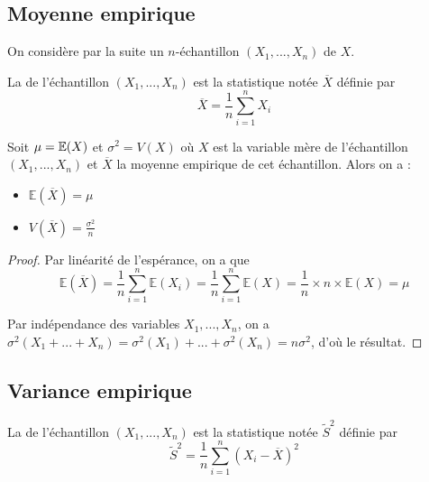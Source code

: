 \subsection{Moyenne empirique}
On considère par la suite un $n$-échantillon $(X_1,...,X_n)$ de $X$.

\begin{definition}{}{}
La  de l'échantillon $(X_1,...,X_n)$ est la statistique notée $\overline{X}$ définie par 
$$\overline{X}=\frac{1}{n}\sum_{i=1}^n X_i$$
\end{definition}

\begin{proposition}{}{}
 Soit $\mu=\mathbb{E}(X)$ et $\sigma^2=V(X)$ où $X$ est la variable mère de l'échantillon $(X_1,...,X_n)$ et $\overline{X}$ la moyenne empirique de cet échantillon. Alors on a :
 \begin{itemize}
  \item $\mathbb{E}(\overline{X})=\mu$
  \item $V(\overline{X}) = \frac{\sigma^2}{n}$
 \end{itemize}
\end{proposition}
\begin{proof}
 Par linéarité de l'espérance, on a que $$\mathbb{E}(\overline{X})=\frac{1}{n}\sum_{i=1}^n \mathbb{E}(X_i)=\frac{1}{n}\sum_{i=1}^n \mathbb{E}(X) = \frac{1}{n} \times n \times \mathbb{E}(X) = \mu$$
 
 Par indépendance des variables $X_1,...,X_n$, on a  $\sigma^2(X_1+...+X_n)=\sigma^2(X_1)+...+\sigma^2(X_n) = n \sigma^2$, d'où le résultat.
\end{proof}

\subsection{Variance empirique}
\begin{definition}{}{}
La  de l'échantillon $(X_1,...,X_n)$ est la statistique notée $\tilde{S}^2$ définie par 
$$\tilde{S}^2=\frac{1}{n}\sum_{i=1}^n (X_i-\overline{X})^2$$
\end{definition}

